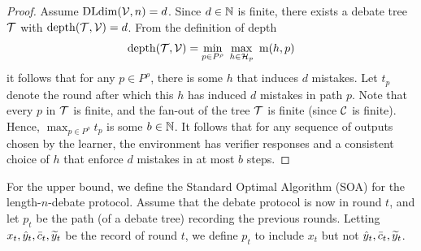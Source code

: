 \documentclass[11pt,letterpaper]{article}
\theoremstyle{definition}
\theoremstyle{plain}
\begin{document}
\begin{proof}
Assume $\mathrm{DLdim}({\mathcal V}, n) = d$. 
Since $d\in\mathbb{N}$ is finite, there exists a debate tree ${\mathcal T}$ with $\mathrm{depth}({\mathcal T},{\mathcal V}) = d$. 
From the definition of depth
\[
\mathrm{depth}({\mathcal T},{\mathcal V}) =  \min_{p\in P^\rho}~  \max_{h\in {{\mathcal H}}_p}~ \mathrm{m}(h, p)
\]
it follows that for any $p \in P^\rho$, there is some $h$ that induces $d$ mistakes. Let $t_p$ denote the round after which this $h$ has induced $d$ mistakes in path $p$. Note that every $p$ in ${\mathcal T}$ is finite, and the fan-out of the tree ${\mathcal T}$ is finite (since ${{\mathcal C}}$ is finite). Hence, 
$\max_{p\in P^\rho} t_p$ is some $b \in \mathbb{N}$. 
It follows that for any sequence of outputs chosen by the learner, the environment has verifier responses and a consistent choice of $h$ that enforce $d$ mistakes in at most $b$ steps. 
\end{proof}

For the upper bound, we define the Standard Optimal Algorithm (SOA) for the length-$n$-debate protocol. Assume that the debate protocol is now in round $t$, and let $p_t$ be the path (of a debate tree) recording the previous rounds. Letting $x_t,{\hat{y}}_t,\bar{c}_t,{\widetilde{y}}_t$ be the record of round $t$, we define $p_t$ to include $x_t$ but not ${\hat{y}}_t,\bar{c}_t,{\widetilde{y}}_t$.
\end{document}

